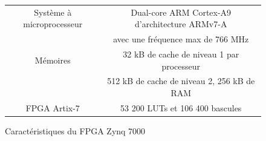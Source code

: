 \begin{figure}[H]
	\centering
	\begin{tabular}{|c|c|}
		\hline
		Système à microprocesseur & Dual-core ARM Cortex-A9 d'architecture ARMv7-A\\
		& avec une fréquence max de 766 MHz\\
		\hline
		Mémoires & 32 kB de cache de niveau 1 par processeur\\
		& 512 kB de cache de niveau 2, 256 kB de RAM\\
		\hline
		FPGA Artix-7 & 53 200 LUTs et 106 400 bascules\\
		\hline
	\end{tabular}
	\caption{Caractéristiques du FPGA Zynq 7000}
	\label{tab:zynq_7000}
\end{figure}